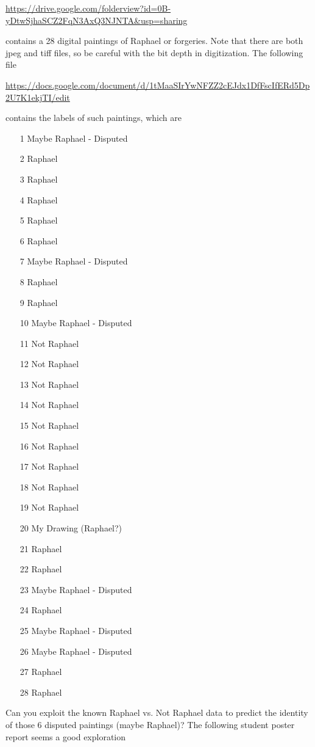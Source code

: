 \documentclass[11pt]{article}
\begin{document}
\url{https://drive.google.com/folderview?id=0B-yDtwSjhaSCZ2FqN3AxQ3NJNTA&usp=sharing}

\noindent contains a 28 digital paintings of Raphael or forgeries. Note that there are both jpeg and tiff files, so be careful with the bit depth in digitization. The following file

\url{https://docs.google.com/document/d/1tMaaSIrYwNFZZ2cEJdx1DfFscIfERd5Dp2U7K1ekjTI/edit}

\noindent contains the labels of such paintings, which are 
\begin{enumerate}
\item[1] Maybe Raphael - Disputed
\item[2] Raphael
\item[3] Raphael
\item[4] Raphael
\item[5] Raphael
\item[6] Raphael
\item[7] Maybe Raphael - Disputed
\item[8] Raphael
\item[9] Raphael
\item[10] Maybe Raphael - Disputed
\item[11] Not Raphael
\item[12] Not Raphael
\item[13] Not Raphael
\item[14] Not Raphael
\item[15] Not Raphael
\item[16] Not Raphael
\item[17] Not Raphael
\item[18] Not Raphael
\item[19] Not Raphael
\item[20] My Drawing (Raphael?)
\item[21] Raphael
\item[22] Raphael
\item[23] Maybe Raphael - Disputed
\item[24] Raphael
\item[25] Maybe Raphael - Disputed
\item[26] Maybe Raphael - Disputed
\item[27] Raphael
\item[28] Raphael
\end{enumerate}
Can you exploit the known Raphael vs. Not Raphael data to predict the identity of those 6 disputed paintings (maybe Raphael)? The following student poster report seems a good exploration
\end{document}
